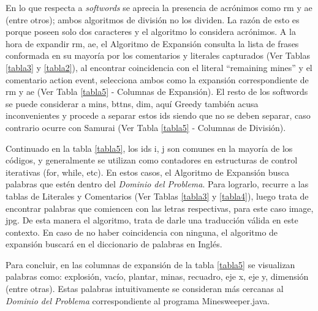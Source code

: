 En lo que respecta a \textit{softwords} se aprecia la presencia de acrónimos como \textsf{rm} y \textsf{ae} (entre otros); ambos algoritmos de división no los dividen. La razón de esto es porque  poseen solo dos caracteres y el algoritmo lo considera acrónimos.
 A la hora de expandir \textsf{rm}, \textsf{ae}, el Algoritmo de Expansión consulta la lista de frases conformada en su mayoría por los comentarios y literales capturados (Ver Tablas \ref{tabla3} y \ref{tabla2}), al encontrar coincidencia con el literal \textsf{“remaining mines”} y el comentario \textsf{action event}, selecciona ambos como la expansión correspondiente de \textsf{rm} y \textsf{ae} (Ver Tabla \ref{tabla5} - Columnas de Expansión).
El resto de los softwords se puede considerar a \textsf{mins}, \textsf{bttns}, \textsf{dim}, aquí Greedy también acusa inconvenientes y procede a separar estos ids siendo que no se deben separar, caso contrario ocurre con Samurai (Ver Tabla \ref{tabla5} - Columnas de División). %

Continuado en la tabla \ref{tabla5}, los ids \textsf{i}, \textsf{j} son comunes en la mayoría de los códigos, y generalmente se utilizan como contadores en estructuras de control iterativas (\textsf{for}, \textsf{while}, etc). En estos casos, el Algoritmo de Expansión busca palabras que estén dentro del \textit{Dominio del Problema}. Para lograrlo, recurre a las tablas de Literales y Comentarios (Ver Tablas \ref{tabla3} y \ref{tabla4}), luego trata de encontrar palabras que comiencen con las letras respectivas, para este caso \textsf{image}, \textsf{jpg}. De esta manera el algoritmo, trata de darle una traducción válida en este contexto. En caso de no haber coincidencia con ninguna, el algoritmo de expansión buscará en el diccionario de palabras en Inglés.

Para concluir, en las columnas de expansión de la tabla \ref{tabla5} se visualizan palabras como: explosión, vacío, plantar, minas, recuadro, eje x, eje y, dimensión (entre otras). Estas palabras intuitivamente se consideran más cercanas al \textit{Dominio del Problema} correspondiente al programa Minesweeper.java.


